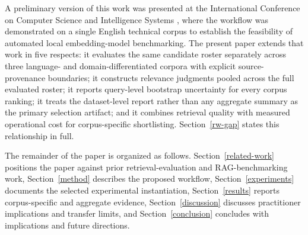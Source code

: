 A preliminary version of this work was presented at the International Conference on Computer Science and Intelligence Systems \citep{Karakaya_Conference_2025}, where the workflow was demonstrated on a single English technical corpus to establish the feasibility of automated local embedding-model benchmarking. The present paper extends that work in five respects: it evaluates the same candidate roster separately across three language- and domain-differentiated corpora with explicit source-provenance boundaries; it constructs relevance judgments pooled across the full evaluated roster; it reports query-level bootstrap uncertainty for every corpus ranking; it treats the dataset-level report rather than any aggregate summary as the primary selection artifact; and it combines retrieval quality with measured operational cost for corpus-specific shortlisting. Section~\ref{rw-gap} states this relationship in full.

The remainder of the paper is organized as follows. Section~\ref{related-work} positions the paper against prior retrieval-evaluation and RAG-benchmarking work, Section~\ref{method} describes the proposed workflow, Section~\ref{experiments} documents the selected experimental instantiation, Section~\ref{results} reports corpus-specific and aggregate evidence, Section~\ref{discussion} discusses practitioner implications and transfer limits, and Section~\ref{conclusion} concludes with implications and future directions.
